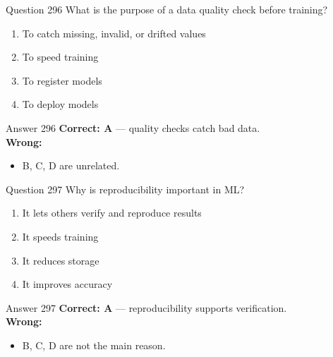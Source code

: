 \documentclass[aspectratio=169,11pt]{beamer}
\begin{document}
	\begin{frame}{Question 296}
		What is the purpose of a data quality check before training?
		\begin{enumerate}[label=\Alph*.]
			\item To catch missing, invalid, or drifted values
			\item To speed training
			\item To register models
			\item To deploy models
		\end{enumerate}
	\end{frame}
	\begin{frame}{Answer 296}
		\textbf{Correct: A} --- quality checks catch bad data.\\
		\vspace{0.5em}
		\textbf{Wrong:}
		\begin{itemize}
			\item B, C, D are unrelated.
		\end{itemize}
	\end{frame}
	
	\begin{frame}{Question 297}
		Why is reproducibility important in ML?
		\begin{enumerate}[label=\Alph*.]
			\item It lets others verify and reproduce results
			\item It speeds training
			\item It reduces storage
			\item It improves accuracy
		\end{enumerate}
	\end{frame}
	\begin{frame}{Answer 297}
		\textbf{Correct: A} --- reproducibility supports verification.\\
		\vspace{0.5em}
		\textbf{Wrong:}
		\begin{itemize}
			\item B, C, D are not the main reason.
		\end{itemize}
	\end{frame}
	
\end{document}
